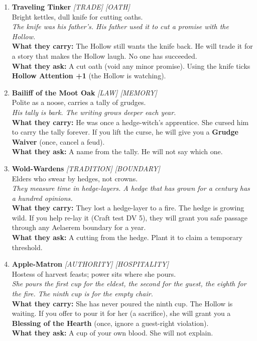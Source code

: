 \begin{enumerate}
\item \textbf{Traveling Tinker} \hfill \textit{[TRADE] [OATH]} \\
  Bright kettles, dull knife for cutting oaths. \\
  \textit{The knife was his father's. His father used it to cut a promise with the Hollow.} \\
  \textbf{What they carry:} The Hollow still wants the knife back. He will trade it for a story that makes the Hollow laugh. No one has succeeded. \\
  \textbf{What they ask:} A cut oath (void any minor promise). Using the knife ticks \textbf{Hollow Attention +1} (the Hollow is watching).

\item \textbf{Bailiff of the Moot Oak} \hfill \textit{[LAW] [MEMORY]} \\
  Polite as a noose, carries a tally of grudges. \\
  \textit{His tally is bark. The writing grows deeper each year.} \\
  \textbf{What they carry:} He was once a hedge-witch's apprentice. She cursed him to carry the tally forever. If you lift the curse, he will give you a \textbf{Grudge Waiver} (once, cancel a feud). \\
  \textbf{What they ask:} A name from the tally. He will not say which one.

\item[J] \textbf{Wold-Wardens} \hfill \textit{[TRADITION] [BOUNDARY]} \\
  Elders who swear by hedges, not crowns. \\
  \textit{They measure time in hedge-layers. A hedge that has grown for a century has a hundred opinions.} \\
  \textbf{What they carry:} They lost a hedge-layer to a fire. The hedge is growing wild. If you help re-lay it (Craft test DV 5), they will grant you safe passage through any Aelaerem boundary for a year. \\
  \textbf{What they ask:} A cutting from the hedge. Plant it to claim a temporary threshold.

\item[Q] \textbf{Apple-Matron} \hfill \textit{[AUTHORITY] [HOSPITALITY]} \\
  Hostess of harvest feasts; power sits where she pours. \\
  \textit{She pours the first cup for the eldest, the second for the guest, the eighth for the fire. The ninth cup is for the empty chair.} \\
  \textbf{What they carry:} She has never poured the ninth cup. The Hollow is waiting. If you offer to pour it for her (a sacrifice), she will grant you a \textbf{Blessing of the Hearth} (once, ignore a guest-right violation). \\
  \textbf{What they ask:} A cup of your own blood. She will not explain.


\end{enumerate}
